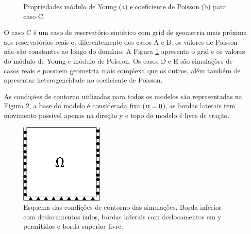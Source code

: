 \begin{figure}[ht]
\center
{}
\qquad
{}
\caption{Propriedades módulo de Young (a) e coeficiente de Poisson (b) para caso C. } \label{fig:casoCgrid}
\end{figure}

O caso C é um caso de reservatório sintético com grid de geometria mais próxima aos reservatórios reais e, diferentemente dos casos A e B, os valores de Poisson não são constantes ao longo do domínio. A Figura \ref{fig:casoCgrid} apresenta o grid e os valores do módulo de Young e módulo de Poisson. Os casos D e E são simulações de casos reais e possuem geometria mais complexa que os outros, além também de apresentar heterogeneidade no coeficiente de Poisson.

\fi

As condições de contorno utilizadas para todos os modelos são representadas na Figura \ref{fig:CondicoesContorno}, a base do modelo é considerada fixa ($\mathbf{u}=0$), as bordas laterais tem movimento possível apenas na direção y e topo do modelo é livre de tração.

\begin{figure}[!htbp]
    \centering
    \includegraphics[height=4cm]{chap08/figs/CondicoesContorno.png}
    \caption{Esquema das condições de contorno das simulações. Borda inferior com deslocamentos nulos, bordas laterais com deslocamentos em y permitidos e borda superior livre.}
    \label{fig:CondicoesContorno}
\end{figure}


